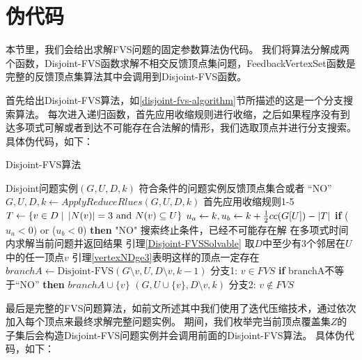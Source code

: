 \section{伪代码}
本节里，我们会给出求解FVS问题的固定参数算法伪代码。
我们将算法分解成两个函数，Disjoint-FVS函数求解不相交反馈顶点集问题，FeedbackVertexSet函数是完整的反馈顶点集算法其中会调用到Disjoint-FVS函数。

首先给出Disjoint-FVS算法，如\ref{disjoint-fvs-algorithm}节所描述的这是一个分支搜索算法。
每次进入递归函数，首先应用收缩规则进行收缩，之后如果程序没有到达多项式可解或者到达不可能存在合法解的情形，我们选取顶点并进行分支搜索。具体伪代码，如下：\\

\begin{algorithm}
\caption{Disjoint-FVS算法}
\begin{algorithmic}[1]
\Require Disjoint问题实例$(G,U, D, k)$
\Ensure  符合条件的问题实例反馈顶点集合或者 “NO”
\algrule
{}
    \State $G, U, D, k \gets ApplyReduceRlues(G, U, D, k)$ \Comment 首先应用收缩规则1-5
    \State $T \gets \{v \in D\;|\;\left\vert N(v) \right\vert = 3 \text{ and } N(v) \subseteq U\}$
    \State $u_a \gets k, u_b \gets k + \frac{1}{2}cc(G[U]) - \left\vert T \right\vert$
    \State \textbf{if} ($u_a < 0$) or ($u_b < 0$) \textbf{then} \Return "NO" \Comment 搜索终止条件，已经不可能存在解
        \State 在多项式时间内求解当前问题并返回结果 \Comment 引理\ref{Disjoint-FVSSolvable}
    \Else
        \State 取$D$中至少有3个邻居在$U$中的任一顶点$v$ 
        \State \Comment 引理\ref{vertexNDge3}表明这样的顶点一定存在
        \State $branchA \gets \text{Disjoint-FVS}(G \setminus v, U, D \setminus v, k - 1)$
        \Comment 分支1: $v \in FVS$
        \State \textbf{if} branchA不等于“NO” \textbf{then} \Return $branchA \cup \{v\}$
        \State \Return {}$(G, U\cup\{v\}, D \setminus v, k)$
        \Comment 分支2: $v \notin FVS$
    \EndIf
\EndFunction
\end{algorithmic}
\end{algorithm} 

\newpage
最后是完整的FVS问题算法，如前文所述其中我们使用了迭代压缩技术，通过依次加入每个顶点来最终求解完整问题实例。
期间，我们枚举完当前顶点覆盖集$Z$的子集后会构造Disjoint-FVS问题实例并会调用前面的Disjoint-FVS算法。
具体伪代码，如下：\\

